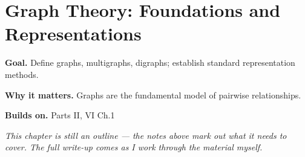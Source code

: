 \chapter{Graph Theory: Foundations and Representations}
\label{ch:06-combinatorics-and-graph-theory-06}

\begin{chapterintro}
\textbf{Goal.} Define graphs, multigraphs, digraphs; establish standard representation methods.

\textbf{Why it matters.} Graphs are the fundamental model of pairwise relationships.

\textbf{Builds on.} Parts II, VI Ch.1
\end{chapterintro}

\textit{This chapter is still an outline --- the notes above mark out what it needs to cover. The full write-up comes as I work through the material myself.}
